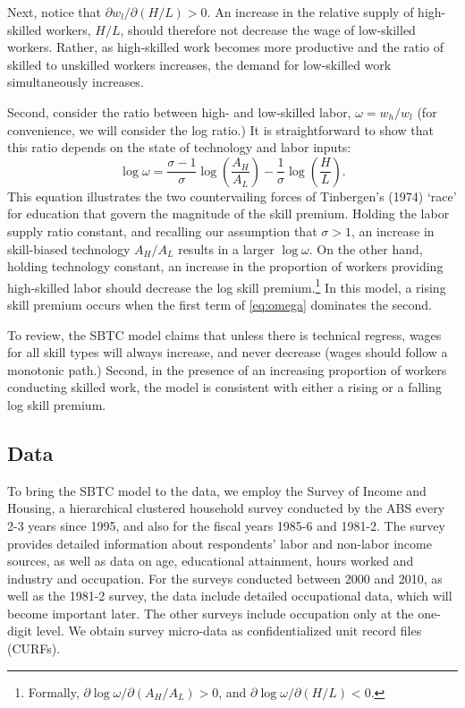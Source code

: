 \documentclass[a4paper,11pt,notitlepage]{article}
\begin{document}
Next, notice that $\partial w_l/\partial(H/L)>0$. An increase in the relative supply of high-skilled workers, $H/L$, should therefore not decrease the wage of low-skilled workers. Rather, as high-skilled work becomes more productive and the ratio of skilled to unskilled workers increases, the demand for low-skilled work simultaneously increases. 

Second, consider the ratio between high- and low-skilled labor, $\omega=w_h/w_l$ (for convenience, we will consider the log ratio.) It is straightforward to show that this ratio depends on the state of technology and labor inputs:
\begin{equation}\label{eq:omega}
\log \omega = \frac{\sigma-1}{\sigma}\log\left(\frac{A_H}{A_L}\right) - \frac{1}{\sigma}\log\left(\frac{H}{L}\right).
\end{equation}
This equation illustrates the two countervailing forces of Tinbergen's (1974) `race' for education that govern the magnitude of the skill premium. Holding the labor supply ratio constant, and recalling our assumption that $\sigma >1$, an increase in skill-biased technology $A_H/A_L$ results in a larger $\log\omega$. On the other hand, holding technology constant, an increase in the proportion of workers providing high-skilled labor should decrease the log skill premium.\footnote{Formally, $\partial \log\omega / \partial(A_H/A_L) > 0$, and 
$\partial \log\omega / \partial(H/L) < 0$.} In this model, a rising skill premium occurs when the first term of \eqref{eq:omega}  dominates the second.

To review, the SBTC model claims that unless there is technical regress, wages for all skill types will always increase, and never decrease (wages should follow a monotonic path.) Second, in the presence of an increasing proportion of workers conducting skilled work, the model is consistent with either a rising or a falling log skill premium.

\subsection{Data}

To bring the SBTC model to the data, we employ the Survey of Income and Housing, a hierarchical clustered household survey conducted by the ABS every 2-3 years since 1995, and also for the fiscal years 1985-6 and 1981-2. The survey provides detailed  information about respondents' labor and non-labor income sources, as well as data on age, educational attainment, hours worked and industry and occupation. For the surveys conducted between 2000 and 2010, as well as the 1981-2 survey, the data include detailed occupational data, which will become important later. The other surveys include occupation only at the one-digit level. We obtain survey micro-data as confidentialized unit record files (CURFs).
\end{document}
